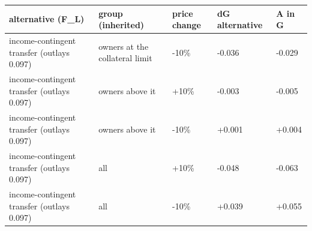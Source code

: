 \begingroup\small
\setlength{\tabcolsep}{3pt}
\renewcommand{\arraystretch}{1.04}
\begin{tabularx}{\linewidth}{XXXXX}
\toprule
alternative (F\_L) & group (inherited) & price change & dG alternative & A in G \\
\midrule
income-contingent transfer (outlays 0.097) & owners at the collateral limit & -10\% & -0.036 & -0.029 \\
income-contingent transfer (outlays 0.097) & owners above it & +10\% & -0.003 & -0.005 \\
income-contingent transfer (outlays 0.097) & owners above it & -10\% & +0.001 & +0.004 \\
income-contingent transfer (outlays 0.097) & all & +10\% & -0.048 & -0.063 \\
income-contingent transfer (outlays 0.097) & all & -10\% & +0.039 & +0.055 \\
\bottomrule
\end{tabularx}
\endgroup
